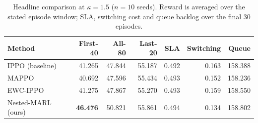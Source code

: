 \begin{table}[t]
\centering
\caption{Headline comparison at $\kappa=1.5$ ($n=10$ seeds). Reward is averaged over the stated episode window; SLA, switching cost and queue backlog over the final 30 episodes.}
\label{tab:headline}
\footnotesize
\begin{tabular}{lrrrrrr}
\toprule
Method & First-40 & All-80 & Last-20 & SLA & Switching & Queue \\
\midrule
IPPO (baseline) & 41.265 & 47.844 & 55.187 & 0.492 & 0.163 & 158.388 \\
MAPPO & 40.692 & 47.596 & 55.434 & 0.493 & 0.152 & 158.236 \\
EWC-IPPO & 41.275 & 47.867 & 55.270 & 0.493 & 0.159 & 158.550 \\
Nested-MARL (ours) & \textbf{46.476} & 50.821 & 55.861 & 0.494 & 0.134 & 158.802 \\
\bottomrule
\end{tabular}
\end{table}
